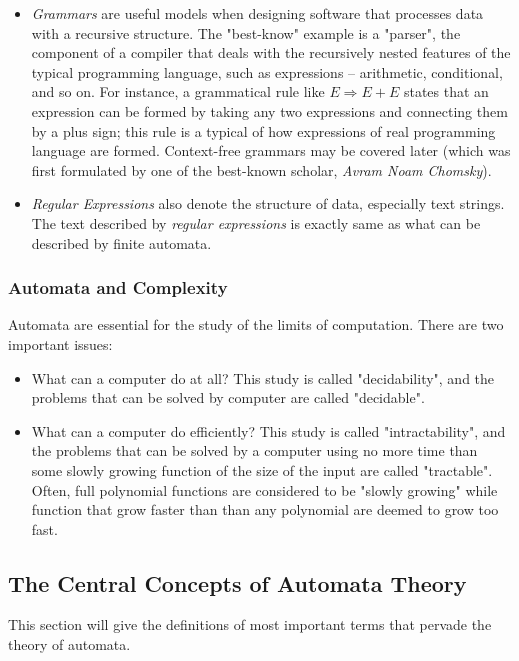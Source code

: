 \documentclass[12pt,reqno]{amsart}
\begin{document}
\begin{itemize}
	\item \textit{Grammars} are useful models when designing software that processes data with a recursive structure. The "best-know" example is a "parser", the component of a compiler that deals with the recursively nested features of the typical programming language, such as expressions -- arithmetic, conditional, and so on. For instance, a grammatical rule like $E \Rightarrow E + E$ states that an expression can be formed by taking any two expressions and connecting them by a plus sign; this rule is a typical of how expressions of real programming language are formed. Context-free grammars may be covered later (which was first formulated by one of the best-known scholar, \textit{Avram Noam Chomsky}). 
	\item \textit{Regular Expressions} also denote the structure of data, especially text strings. The text described by \textit{regular expressions} is exactly same as what can be described by finite automata.
\end{itemize}

\subsubsection{Automata and Complexity}
Automata are essential for the study of the limits of computation. There are two important issues:
\begin{itemize}
	\item What can a computer do at all? This study is called "decidability", and the problems that can be solved by computer are called "decidable".
	\item What can a computer do efficiently? This study is called "intractability", and the problems that can be solved by a computer using no more time than some slowly growing function of the size of the input are called "tractable". Often, full polynomial functions are considered to be "slowly growing" while function that grow faster than than any polynomial are deemed to grow too fast.
\end{itemize}



\subsection{The Central Concepts of Automata Theory}
This section will give the definitions of most important terms that pervade the theory of automata.
\end{document}
